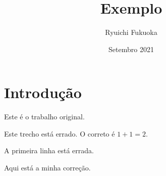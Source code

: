 \documentclass{article}
\title{Exemplo}
\author{Ryuichi Fukuoka}
\date{Setembro 2021}
\begin{document}
\maketitle

\section{Introdução}

\indent

Este é o trabalho original.

Este trecho está errado. O correto é $1+1=2$.

A primeira linha está errada.

Aqui está a minha correção.
\end{document}
